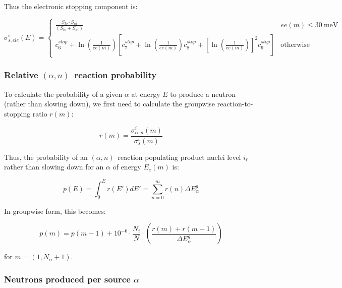 \documentclass[10pt]{article}
\newcommand{\alphn}[0]{$\left(\alpha,n\right)$}
\begin{document}
Thus the electronic stopping component is:

\begin{equation}
\sigma_{s,ele}^i \left(E\right) =
\begin{cases}
\displaystyle \frac{S_{lo} \cdot S_{hi} }{\left(S_{lo} + S_{hi} \right)} & ee\left(m\right) \leq 30\ \mathrm{meV} \\[12pt]
\displaystyle {c_6^{stop}} + \ln\left(\frac{1}{ee\left(m\right)} \right) \left[ c_7^{stop} + \ln\left(\frac{1}{ee\left(m\right)} \right) c_8^{stop} + \left[\ln\left(\frac{1}{ee\left(m\right)}\right)\right]^2 c_9^{stop} \right] & \mathrm{otherwise}
\end{cases}
\end{equation}

\subsubsection{Relative \alphn\ reaction probability}

To calculate the probability of a given $\alpha$ at energy $E$ to produce a neutron (rather than slowing down), we first need to calculate the groupwise reaction-to-stopping ratio $r\left(m\right)$:

\begin{equation}
r\left(m\right) = \frac{ \sigma_{\alpha,n}^i \left(m\right) }{ \sigma_s^i \left(m\right) }
\end{equation}

Thus, the probability of an \alphn\ reaction populating product nuclei level $i_\ell$ rather than slowing down for an $\alpha$ of energy $E_e\left(m\right)$ is:

\begin{equation}
p\left(E\right) = \int_0^E r\left(E'\right) dE' = \sum_{n=0}^{m} r\left(n\right) \Delta E_\alpha^g
\label{eq:an_prob_int}
\end{equation}
 
In groupwise form, this becomes:

\begin{equation}
p\left(m\right) = p\left(m-1\right) + 10^{-6} \cdot \frac{N_i}{N} \cdot \left( \frac{r\left(m \right) + r\left(m - 1 \right) }{\Delta E_\alpha^g } \right)
\label{eq:an_prob_groupwise}
\end{equation}

for $m=\left(1,N_\alpha + 1\right)$.

\subsubsection{Neutrons produced per source $\alpha$}
\end{document}
